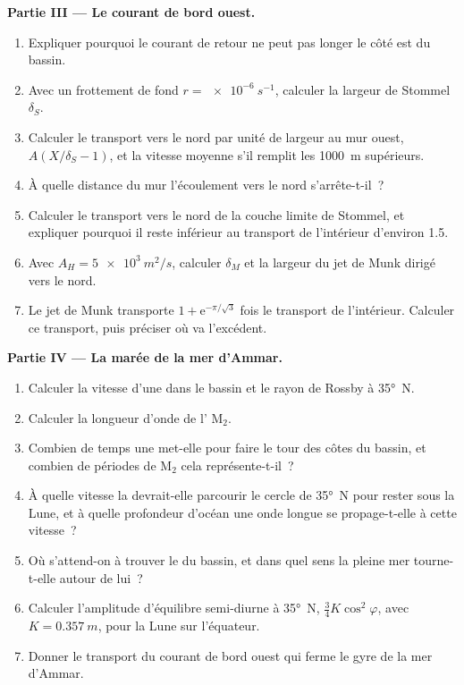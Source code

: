 \begin{problem}
\medskip\noindent\textbf{Partie III --- Le courant de bord ouest.}
\begin{enumerate}[resume]
\item Expliquer pourquoi le courant de retour ne peut pas longer le côté est du
  bassin.
\item Avec un frottement de fond $r = \qty{e-6}{s^{-1}}$, calculer la largeur
  de Stommel $\delta_S$.
\item Calculer le transport vers le nord par unité de largeur au mur ouest,
  $A(X/\delta_S - 1)$, et la vitesse moyenne s'il remplit les
  \qty{1000}{m} supérieurs.
\item À quelle distance du mur l'écoulement vers le nord s'arrête-t-il~?
\item Calculer le transport vers le nord de la couche limite de Stommel, et expliquer
  pourquoi il reste inférieur au transport de l'intérieur d'environ
  \qty{1.5}{\sverdrup}.
\item Avec $A_H = \qty{5e3}{m^2/s}$, calculer $\delta_M$ et la largeur du jet
  de Munk dirigé vers le nord.
\item Le jet de Munk transporte $1 + \mathrm e^{-\pi/\sqrt3}$ fois le transport de
  l'intérieur. Calculer ce transport, puis préciser où va l'excédent.
\end{enumerate}

\medskip\noindent\textbf{Partie IV --- La marée de la mer d'Ammar.}
\begin{enumerate}[resume]
\item Calculer la vitesse d'une  dans le bassin et le rayon de
  Rossby à \ang{35}~N.
\item Calculer la longueur d'onde de l' M$_2$.
\item Combien de temps une  met-elle pour faire le tour des côtes du
  bassin, et combien de périodes de M$_2$ cela représente-t-il~?
\item À quelle vitesse la  devrait-elle parcourir le cercle
  de \ang{35}~N pour rester sous la Lune, et à quelle profondeur d'océan
  une onde longue se propage-t-elle à cette vitesse~?
\item Où s'attend-on à trouver le  du bassin, et dans quel
  sens la pleine mer tourne-t-elle autour de lui~?
\item Calculer l'amplitude d'équilibre semi-diurne à \ang{35}~N, $\tfrac34
  K\cos^2\varphi$, avec $K = \qty{0.357}{m}$, pour la Lune sur l'équateur.
\item Donner le transport du courant de bord ouest qui ferme le gyre de la
  mer d'Ammar.
\end{enumerate}
\end{problem}
